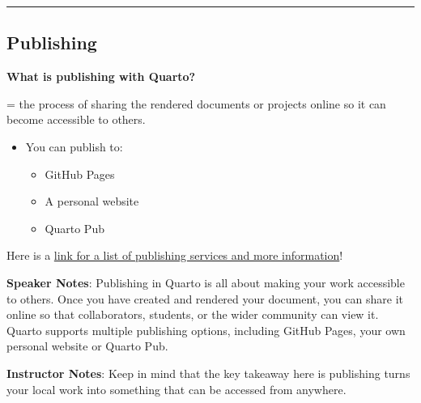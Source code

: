 \documentclass[
  letterpaper,
  DIV=11,
  numbers=noendperiod]{scrartcl}
\providecommand{\tightlist}{%
  \setlength{\itemsep}{0pt}\setlength{\parskip}{0pt}}
\begin{document}
\begin{center}\rule{0.5\linewidth}{0.5pt}\end{center}

\subsection{Publishing}\label{publishing}

\textbf{What is publishing with Quarto?}

= the process of sharing the rendered documents or projects online so it
can become accessible to others.

\begin{itemize}
\tightlist
\item
  You can publish to:

  \begin{itemize}
  \tightlist
  \item
    GitHub Pages
  \item
    A personal website
  \item
    Quarto Pub
  \end{itemize}
\end{itemize}

\begin{tcolorbox}[enhanced jigsaw, opacitybacktitle=0.6, toptitle=1mm, colbacktitle=quarto-callout-note-color!10!white, toprule=.15mm, left=2mm, colback=white, colframe=quarto-callout-note-color-frame, opacityback=0, bottomtitle=1mm, breakable, titlerule=0mm, rightrule=.15mm, arc=.35mm, title=\textcolor{quarto-callout-note-color}{\faInfo}\hspace{0.5em}{List of publishing services}, bottomrule=.15mm, coltitle=black, leftrule=.75mm]

Here is a \href{https://quarto.org/docs/publishing/index.html}{link for
a list of publishing services and more information}!

\end{tcolorbox}

\textbf{Speaker Notes}: Publishing in Quarto is all about making your
work accessible to others. Once you have created and rendered your
document, you can share it online so that collaborators, students, or
the wider community can view it. Quarto supports multiple publishing
options, including GitHub Pages, your own personal website or Quarto
Pub.

\textbf{Instructor Notes}: Keep in mind that the key takeaway here is
publishing turns your local work into something that can be accessed
from anywhere.
\end{document}
